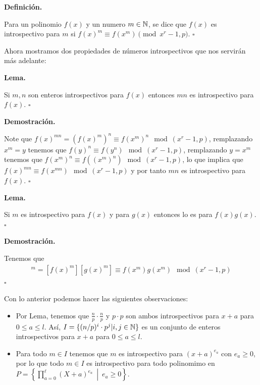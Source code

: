 \documentclass{article}
\newenvironment{dem}{\par\noindent\textbf{Demostración.}\par}{\hfill$\square$\par}
\newenvironment{lem}{\par\noindent\textbf{Lema.}\par}{\hfill$\square$\par}
\newenvironment{deff}{\par\noindent\textbf{Definición.}\par}{\hfill$\square$\par}
\begin{document}
\begin{deff}
    Para un polinomio $f(x)$ y un numero $m\in \mathbb{N}$, se dice que $f(x)$ es introspectivo para $m$ si
    $f(x)^m \equiv f(x^m) \pmod{x^r - 1, p}$.
\end{deff}

Ahora mostramos dos propiedades de números introspectivos que nos servirán más adelante:

\begin{lem}
    Si $m,n$ son enteros introspectivos para $f(x)$ entonces $mn$ es introspectivo para $f(x)$.
\end{lem}

\begin{dem}
    Note que $f(x)^{mn} = (f(x)^m)^n \equiv f(x^m)^n  \mod(x^r - 1, p)$, remplazando $x^m=y$ tenemos que $f(y)^n \equiv f(y^n) \mod(x^r - 1, p)$, 
    remplazando $y=x^m$ tenemos que $f(x^m)^n \equiv f((x^m)^n) \mod(x^r - 1, p)$, lo que implica que $f(x)^{mn} \equiv f(x^{mn}) \mod(x^r - 1, p)$ y 
    por tanto $mn$ es introspectivo para $f(x)$.    
\end{dem}

\begin{lem}
    Si $m$ es introspectivo para $f(x)$ y para $g(x)$ entonces lo es para $f(x)g(x)$.
\end{lem}

\begin{dem}
    Tenemos que
    \begin{align}
        [f(x)g(x)]^m = [f(x)^m][g(x)^m] \equiv f(x^m)g(x^m) \mod(x^r - 1, p)
    \end{align}
\end{dem}

Con lo anterior podemos hacer las siguientes observaciones:
\begin{itemize}
    \item Por Lema, tenemos que $\frac{n}{p} \cdot \frac{n}{p}$ y $p \cdot p$ son ambos introspectivos para $x+a$ para $0\leq a\leq l$. Así, $I=\{(n/p)^i\cdot p^j | i,j \in \mathbb{N}\}$ es un conjunto de enteros introspectivos para $x+a$ para $0\leq a\leq l$.
    \item Para todo $m \in I$ tenemos que $m$ es introspectivo para $(x+a)^{e_a}$ con $e_a\geq 0$, por lo que todo $m \in I$ es introspectivo para todo polinomimo en $P=\left\{\prod_{a=0}^{\ell}(X+a)^{e_a}\ \middle|\ e_a\geq 0\right\}$.
\end{itemize}
\end{document}
